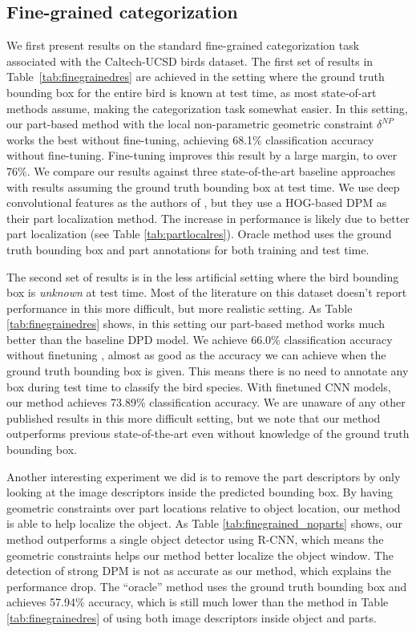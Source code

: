 \subsection{Fine-grained categorization}
We first present results on the standard fine-grained categorization task associated with the Caltech-UCSD birds dataset.
The first set of results in Table~\ref{tab:finegrainedres} are achieved in the setting where the ground truth bounding box for the entire bird is known at test time, as most state-of-art methods assume, making the categorization task somewhat easier. 
In this setting, our part-based method with the local non-parametric geometric constraint $\delta^{NP}$ works the best without fine-tuning, achieving 68.1\% classification accuracy without fine-tuning.
Fine-tuning improves this result by a large margin, to over 76\%.
We compare our results against three state-of-the-art baseline approaches with results assuming the ground truth bounding box at test time. We use deep convolutional features as the authors of \cite{decaf}, but they use a HOG-based DPM as their part localization method. The increase in performance is likely due to better part localization (see Table \ref{tab:partlocalres}). Oracle method uses the ground truth bounding box and part annotations for both training and test time. 

The second set of results is in the less artificial setting where the bird bounding box is \emph{unknown} at test time. Most of the literature on this dataset doesn't  report performance in this more difficult, but more realistic setting. As Table \ref{tab:finegrainedres} shows, in this setting our part-based method works much better than the baseline DPD model. We achieve 66.0\% classification accuracy without finetuning , almost as good as the accuracy we can achieve when the ground truth bounding box is given. This means there is no need to annotate any box during test time to classify the bird species. With finetuned CNN models, our method achieves 73.89\% classification accuracy. 
We are unaware of any other published results in this more difficult setting, but we note that our method outperforms previous state-of-the-art even without knowledge of the ground truth bounding box.

Another interesting experiment we did is to remove the part descriptors by only looking at the image descriptors inside the predicted bounding box. By having geometric constraints over part locations relative to object location, our method is able to help localize the object. As Table \ref{tab:finegrained_noparts} shows, our method outperforms a single object detector using R-CNN, which means the geometric constraints helps our method better localize the object window. The detection of strong DPM is not as accurate as our method, which explains the performance drop.
The ``oracle'' method uses the ground truth bounding box and achieves 57.94\% accuracy, which is still much lower than the method in Table \ref{tab:finegrainedres} of using both image descriptors inside object and parts.


